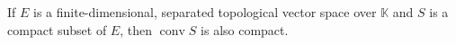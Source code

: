 If $E$ is a finite-dimensional, separated topological vector space over $\mathbb{K}$ and $S$ is a compact subset of $E$, then $\operatorname{conv} S$ is also compact.
